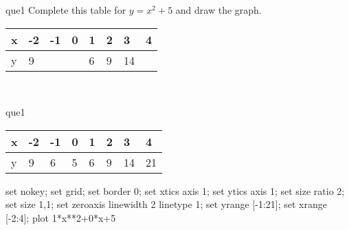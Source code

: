 \documentclass[13.5pt, varwidth=true]{beamer}
\begin{document}
\begin{frame}[shrink=19,fragile]
	\begin{beamercolorbox}[rounded=true, left, shadow=true,wd=14.8cm]{que1}
		 Complete this table for $y = x^{2} + 5$ and draw the graph. \\[0.3cm] \renewcommand{\arraystretch}{1.2}\begin{tabular}{|C|C|C|C|C|C|C|C|} \hline x & -2 & -1 & 0 & 1 & 2 & 3 & 4 \\ \hline y & 9 &  &  & 6 & 9 & 14 & \\ \hline \end{tabular}\\[0.3cm]
	\end{beamercolorbox}
\end{frame}
\begin{frame}[shrink=19,fragile]
	\begin{beamercolorbox}[rounded=true, left, shadow=true,wd=14.8cm]{que1}
		\renewcommand{\arraystretch}{1.2}\begin{tabular}{|C|C|C|C|C|C|C|C|} \hline x & -2 & -1 & 0 & 1 & 2 & 3 & 4 \\ \hline y & 9 & 6 & 5 & 6 & 9 & 14 & 21\\ \hline \end{tabular}\begin{gnuplot}[terminal=pdf] set nokey; set grid; set border 0; set xtics axis 1; set ytics axis 1; set size ratio 2; set size 1,1; set zeroaxis linewidth 2 linetype 1; set yrange [-1:21]; set xrange [-2:4]; plot 1*x**2+0*x+5 \end{gnuplot}
	\end{beamercolorbox}
\end{frame}
\end{document}
